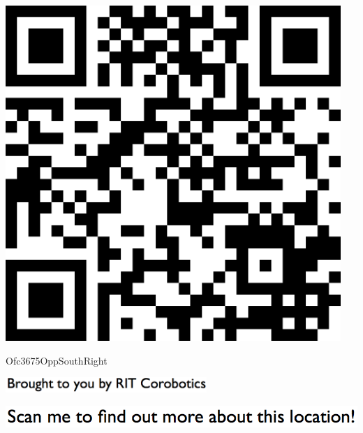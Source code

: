 \documentclass[letterpaper]{article}
\begin{document}
 \begingroup 
 \centerline{\includegraphics[scale=1,width=5in,height=5in]{Ofc3675OppSouthRight.png}} 
 \endgroup 
 \vspace*{\fill} 

 \hfill{\small Ofc3675OppSouthRight} 

  \vspace{0.7in} 
 
 \centerline{\includegraphics[scale=1,width=3in]{text-bottom.png}} 
 
 \pagebreak 
{} 
 \vspace*{\fill} 
 
  \centerline{\includegraphics[scale=1,width=6in]{text-top.png}} 
 
 \vspace{0.5in} 
 
\end{document}
